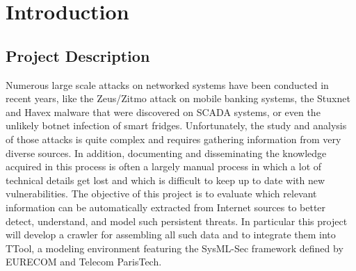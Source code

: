 \documentclass[a4paper,12pt,oneside]{report}
\newcommand{\mychapter}[2]{
    \setcounter{chapter}{#1}
    \setcounter{section}{0}
    \chapter*{#2}
    \addcontentsline{toc}{chapter}{#2}
}
\begin{document}






\mychapter{1}{Introduction} 
\section{Project Description}
	Numerous large scale attacks on networked systems have been conducted in recent years, like
the Zeus/Zitmo attack on mobile banking systems, the Stuxnet and Havex malware that were
discovered on SCADA systems, or even the unlikely botnet infection of smart fridges.
Unfortunately, the study and analysis of those attacks is quite complex and requires gathering
information from very diverse sources. In addition, documenting and disseminating the knowledge
acquired in this process is often a largely manual process in which a lot of technical details get
lost and which is difficult to keep up to date with new vulnerabilities.
The objective of this project is to evaluate which relevant information can be automatically
extracted from Internet sources to better detect, understand, and model such persistent threats.
In particular this project will develop a crawler for assembling all such data and to integrate them
into TTool, a modeling environment featuring the SysML-Sec framework\cite{stuxnet1} defined by EURECOM
and Telecom ParisTech.
\end{document}
